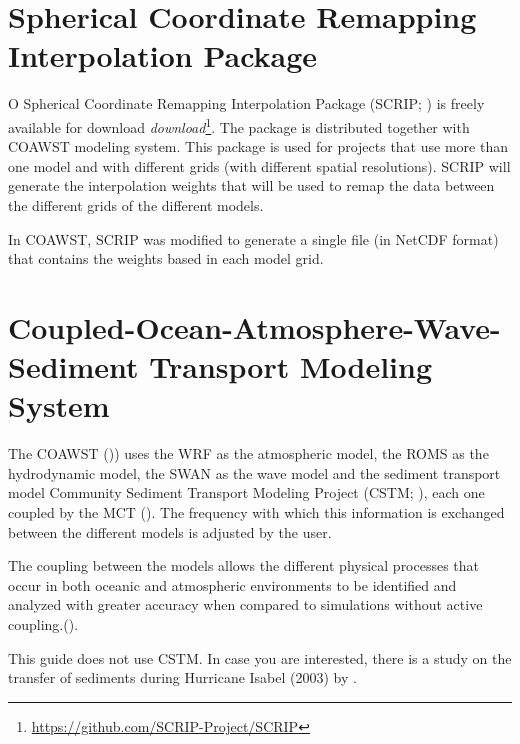 \section{Spherical Coordinate Remapping Interpolation Package}\label{scripsecao}
\bigskip

\noindent O  Spherical Coordinate Remapping Interpolation Package (SCRIP; \cite{Jones1999,Jones1998}) is freely available for download
\textcolor{bleu_cite}{\textit{download}\footnote{\textcolor{bleu_cite}{\href{https://github.com/SCRIP-Project/SCRIP}{https://github.com/SCRIP-Project/SCRIP}}}}. 
The package is distributed together with COAWST modeling system. This package is used for projects that use more than one model and with different grids (with different spatial 
resolutions). SCRIP will generate the interpolation weights that will be used to remap the data between the different grids of the different models.
\bigskip

\noindent In COAWST, SCRIP was modified to generate a single file (in NetCDF format) that contains the weights based in each model grid.
\bigskip

\section{Coupled-Ocean-Atmosphere-Wave-Sediment Transport Modeling System}\label{coawstsecao}
\bigskip
\noindent The COAWST ()\cite{Warner2010,Warner2008}) uses the WRF as the atmospheric model, the ROMS as the hydrodynamic model, the SWAN as the wave model and the sediment transport model
Community Sediment Transport Modeling Project (CSTM; \cite{Warner2008}), each one coupled by the MCT (\cite{Warner2010, Warner2008}). The frequency with which this information is
exchanged between the different models is adjusted by the user.
\bigskip

\noindent The coupling between the models allows the different physical processes that occur in both oceanic and atmospheric environments to be identified and analyzed with greater accuracy 
when compared to simulations without active coupling.(\cite{Pullen2018, Miller2018}).
\bigskip

\begin{tcolorbox}[enhanced,
  grow to left by   = 0cm,
  grow to right by  = 0cm,
  enlarge top by    = 0cm,
  enlarge bottom by = 0cm,
  tcbox raise base,
  boxrule           = 1.0pt,
  left              = 18mm,
  colframe          = red!50!black,coltext=red!25!black,colback=red!10!white,
  overlay           = {\begin{tcbclipinterior}\fill[red!75!blue!50!white] (frame.south west)
    rectangle node[text=white,font=\sffamily\bfseries\footnotesize,rotate=0] {WARNING} ([xshift=18mm]frame.north west);\end{tcbclipinterior}}]
    This guide does not use CSTM. In case you are interested, there is a study on the transfer of sediments during Hurricane Isabel (2003) by \textcite{Warner2010}.
\end{tcolorbox}
\bigskip


